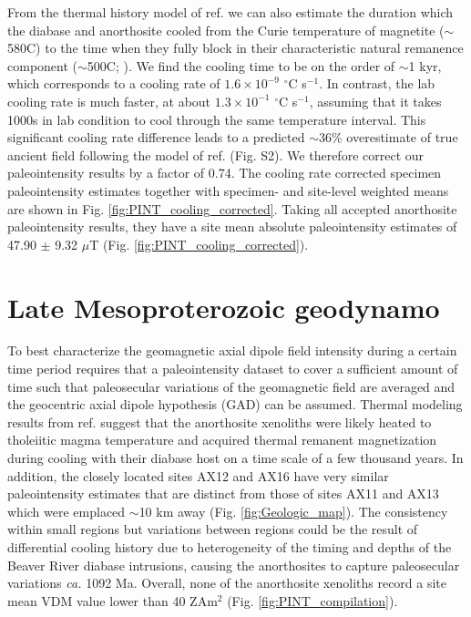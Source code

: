 \documentclass[9pt,twocolumn,twoside,lineno]{pnas-new}
\begin{document}
From the thermal history model of ref. \citealp{Zhang2021b} we can also estimate the duration which the diabase and anorthosite cooled from the Curie temperature of magnetite ($\sim$580\textdegree C) to the time when they fully block in their characteristic natural remanence component ($\sim$500\textdegree C; \cite{Zhang2021b}). We find the cooling time to be on the order of $\sim$1 kyr, which corresponds to a cooling rate of $1.6\times10^{-9}$ $^\circ$C s$^{-1}$. In contrast, the lab cooling rate is much faster, at about $1.3\times10^{-1}$ $^\circ$C s$^{-1}$, assuming that it takes 1000s in lab condition to cool through the same temperature interval. This significant cooling rate difference leads to a predicted $\sim$36\% overestimate of true ancient field following the model of ref. \citealp{Halgedahl1980a} (Fig. S2). We therefore correct our paleointensity results by a factor of 0.74. The cooling rate corrected specimen paleointensity estimates together with specimen- and site-level weighted means are shown in Fig. \ref{fig:PINT_cooling_corrected}. Taking all accepted anorthosite paleointensity results, they have a site mean absolute paleointensity estimates of 47.90 $\pm$ 9.32 $\mu$T (Fig. \ref{fig:PINT_cooling_corrected}). 

\section*{Late Mesoproterozoic geodynamo }
To best characterize the geomagnetic axial dipole field intensity during a certain time period requires that a paleointensity dataset to cover a sufficient amount of time such that paleosecular variations of the geomagnetic field are averaged and the geocentric axial dipole hypothesis (GAD) can be assumed. Thermal modeling results from ref. \citealp{Zhang2021b} suggest that the anorthosite xenoliths were likely heated to tholeiitic magma temperature and acquired thermal remanent magnetization during cooling with their diabase host on a time scale of a few thousand years. In addition, the closely located sites AX12 and AX16 have very similar paleointensity estimates that are distinct from those of sites AX11 and AX13 which were emplaced $\sim$10 km away (Fig. \ref{fig:Geologic_map}). The consistency within small regions but variations between regions could be the result of differential cooling history due to heterogeneity of the timing and depths of the Beaver River diabase intrusions, causing the anorthosites to capture paleosecular variations \textit{ca.} 1092 Ma. Overall, none of the anorthosite xenoliths record a site mean VDM value lower than 40 ZAm$^2$ (Fig. \ref{fig:PINT_compilation}). 
\end{document}
